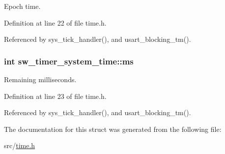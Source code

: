 Epoch time. 



Definition at line 22 of file time.\+h.



Referenced by sys\+\_\+tick\+\_\+handler(), and usart\+\_\+blocking\+\_\+tm().

\hypertarget{structsw__timer__system__time_aafb47623ce45c3d1617e54d2025b679a}{}
\subsubsection[{ms}]{\setlength{\rightskip}{0pt plus 5cm}int sw\+\_\+timer\+\_\+system\+\_\+time\+::ms}\label{structsw__timer__system__time_aafb47623ce45c3d1617e54d2025b679a}


Remaining milliseconds. 



Definition at line 23 of file time.\+h.



Referenced by sys\+\_\+tick\+\_\+handler(), and usart\+\_\+blocking\+\_\+tm().



The documentation for this struct was generated from the following file\+:\begin{DoxyCompactItemize}
\item 
src/\hyperlink{time_8h}{time.\+h}\end{DoxyCompactItemize}
